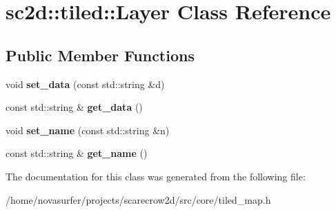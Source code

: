 \hypertarget{classsc2d_1_1tiled_1_1Layer}{}\section{sc2d\+:\+:tiled\+:\+:Layer Class Reference}
\label{classsc2d_1_1tiled_1_1Layer}
\subsection*{Public Member Functions}
\begin{DoxyCompactItemize}
\item 
\mbox{\label{classsc2d_1_1tiled_1_1Layer_aa0e6c3e453de5a7194da721740a49ce6}} 
void {\bfseries set\+\_\+data} (const std\+::string \&d)
\item 
\mbox{\label{classsc2d_1_1tiled_1_1Layer_aab697561335865c9746d1d05749c0b8f}} 
const std\+::string \& {\bfseries get\+\_\+data} ()
\item 
\mbox{\label{classsc2d_1_1tiled_1_1Layer_a0e068cb3d2afcec581e3b7f2683be75f}} 
void {\bfseries set\+\_\+name} (const std\+::string \&n)
\item 
\mbox{\label{classsc2d_1_1tiled_1_1Layer_ae02cb17901359093ec16eab19354a5d5}} 
const std\+::string \& {\bfseries get\+\_\+name} ()
\end{DoxyCompactItemize}


The documentation for this class was generated from the following file\+:\begin{DoxyCompactItemize}
\item 
/home/novasurfer/projects/scarecrow2d/src/core/tiled\+\_\+map.\+h\end{DoxyCompactItemize}
